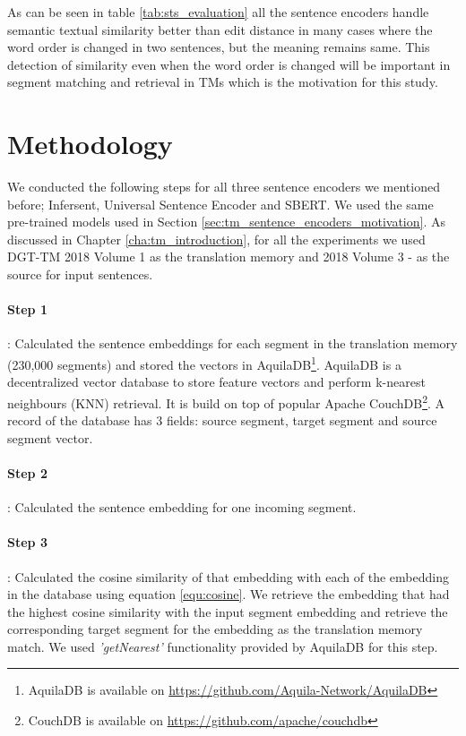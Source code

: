 As can be seen in table \ref{tab:sts_evaluation} all the sentence encoders handle semantic textual similarity better than edit distance in many cases where the word order is changed in two sentences, but the meaning remains same. This detection of similarity even when the word order is changed will be important in segment matching and retrieval in TMs which is the motivation for this study.


\section{Methodology}
\label{sec:tm_sentence_encoders_method}

We conducted the following steps for all three sentence encoders we mentioned before; Infersent, Universal Sentence Encoder and SBERT. We used the same pre-trained models used in Section \ref{sec:tm_sentence_encoders_motivation}. As discussed in Chapter \ref{cha:tm_introduction}, for all the experiments we used DGT-TM 2018 Volume 1 as the translation memory and 2018 Volume 3 - as the source for input sentences. 


	\paragraph{Step 1}: Calculated the sentence embeddings for each segment in the translation memory (230,000 segments) and stored the vectors in AquilaDB\footnote{AquilaDB is available on \url{https://github.com/Aquila-Network/AquilaDB}}. AquilaDB is a decentralized vector database to store feature vectors and perform  k-nearest neighbours (KNN) retrieval. It is build on top of popular Apache CouchDB\footnote{CouchDB is available on \url{https://github.com/apache/couchdb}}. A record of the database has 3 fields: source segment, target segment and source segment vector.
	
	\paragraph{Step 2}: Calculated the sentence embedding for one incoming segment. 
	
	\paragraph{Step 3}: Calculated the cosine similarity of that embedding with each of the embedding in the database using equation \ref{equ:cosine}. We retrieve the embedding that had the highest cosine similarity with the input segment embedding and retrieve the corresponding target segment for the embedding as the translation memory match. We used \textit{'getNearest'} functionality provided by AquilaDB for this step. 
	

